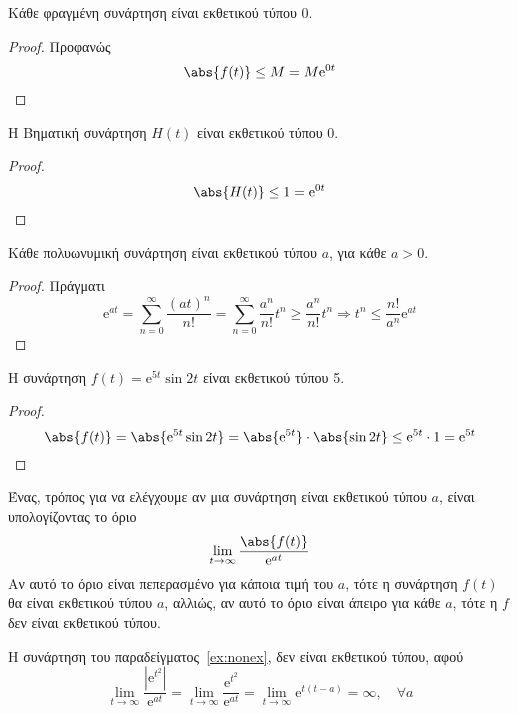 \documentclass[a4paper,table]{report}
\begin{document}
\begin{prop}
  Κάθε φραγμένη συνάρτηση είναι εκθετικού τύπου 0.
\end{prop}
\begin{proof}
  Προφανώς
  \[
    \abs{f(t)} \leq M = M \mathrm{e}^{0t}
  \] 
\end{proof}

\begin{mybox3}
\begin{example}
  Η Βηματική συνάρτηση $ H(t) $ είναι εκθετικού τύπου 0.
\end{example}
\end{mybox3}
\begin{proof}
  \[
    \abs{H(t)} \leq 1 = \mathrm{e}^{0t} 
  \] 
\end{proof}

\begin{prop}
  Κάθε πολυωνυμική συνάρτηση είναι εκθετικού τύπου $a$, για κάθε $ a>0 $.
\end{prop}
\begin{proof}
  Πράγματι
  \[
    \mathrm{e}^{at} = \sum_{n=0}^{\infty} \frac{{(at)}^{n}}{n!} = \sum_{n=0}^{\infty} 
    \frac{a^{n}}{n!} t^{n} \geq \frac{a^{n}}{n!} t^{n} \Rightarrow t^{n} \leq
    \frac{n!}{a^{n}} \mathrm{e}^{at}
  \]
\end{proof}

\begin{mybox3}
\begin{example}
  Η συνάρτηση $ f(t) = \mathrm{e}^{5t} \sin{2t} $ είναι εκθετικού τύπου 5.
\end{example}
\end{mybox3}
\begin{proof}
  \[
    \abs{f(t)} = \abs{\mathrm{e}^{5t} \sin{2t}} = \abs{\mathrm{e}^{5t}} \cdot 
    \abs{\sin{2t}} \leq \mathrm{e}^{5t} \cdot 1 = \mathrm{e}^{5t}
  \] 
\end{proof}

\begin{rem}
  Ένας, τρόπος για να ελέγχουμε αν μια συνάρτηση είναι εκθετικού τύπου $a$, είναι 
  υπολογίζοντας το όριο
  \[
    \lim_{t \to \infty} \frac{\abs{f(t)}}{\mathrm{e}^{at}} 
  \] 
  Αν αυτό το όριο είναι πεπερασμένο για κάποια τιμή του $a$, τότε η συνάρτηση $ f(t)
  $ θα είναι εκθετικού τύπου $a$, αλλιώς, αν αυτό το όριο είναι άπειρο για κάθε $a$, 
  τότε η $f$ δεν είναι εκθετικού τύπου.
\end{rem}

\begin{mybox3}
\begin{example}
  Η συνάρτηση του παραδείγματος~\ref{ex:nonex}, δεν είναι εκθετικού τύπου, αφού
  \[
    \lim_{t \to \infty} \frac{|\mathrm{e}^{t^{2}}|}{\mathrm{e}^{at}} = 
    \lim_{t \to \infty} \frac{\mathrm{e}^{t^{2}}}{\mathrm{e}^{at}} = 
    \lim_{t \to \infty} \mathrm{e}^{t(t-a)} = \infty, \quad \forall a
  \]
\end{example}
\end{mybox3}
\end{document}
